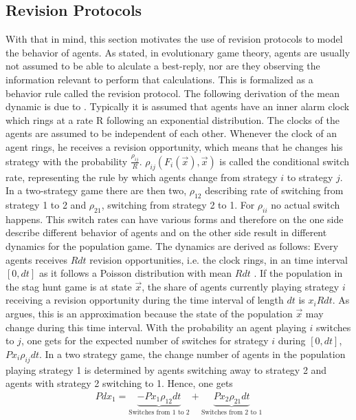 \documentclass[11pt]{article}
\begin{document}
\subsection{Revision Protocols}
\label{sec:revisionprotocols}
With that in mind, this section motivates the use of revision protocols to
model the behavior of agents.
As stated, in evolutionary game theory, agents are usually not assumed to be 
able to alculate a best-reply, nor are they observing the information relevant
to perform that calculations. This is formalized as a behavior rule called
the revision protocol. The following derivation of the mean dynamic is due to 
\textcite{sandholm_population_2010}. Typically it is 
assumed that agents have an inner alarm clock which rings at a rate R 
following an exponential distribution. The clocks of the agents are assumed
to be independent of each other. Whenever the clock of an agent rings, he
receives a revision opportunity, which means that he changes his strategy
with the probability $\frac{\rho_{ij}}{R}$. $\rho_{ij}(F_i(\vec{x}),\vec{x})$
is called the conditional switch rate, representing the rule by which agents
change from strategy $i$ to strategy $j$. 
In a two-strategy game there are then two, $\rho_{12}$ describing rate 
of switching from strategy 1 to 2 and $\rho_{21}$, switching from strategy 2
to 1. For $\rho_{ii}$ no actual switch happens. 
This switch rates can have various forms and therefore on the one side 
describe different behavior of agents and on the other side result in 
different dynamics for the population game.
The dynamics are derived as follows:
Every agents receives $R dt$ revision opportunities, i.e. the clock rings, 
in an time interval $[0,dt]$ as it follows a Poisson distribution with
mean $Rdt$ \cite[123]{sandholm_population_2010}. 
If the population in the stag hunt game is at state $\vec{x}$, the share
of agents currently playing strategy $i$ receiving a revision opportunity 
during the time interval of length $dt$ is $x_i R dt$. As 
\textcite{sandholm_population_2010} argues, this is an approximation because
the state of the population $\vec{x}$ may change during this time interval.
With the probability an agent playing $i$ switches to $j$, one gets for the
expected number of switches for strategy $i$ during $[0,dt]$, 
$P x_i \rho_{ij} dt$. 
In a two strategy game, the change number of agents in the population playing 
strategy 1 is determined by agents switching away to strategy 2 and agents 
with strategy 2 switching to 1.
Hence, one gets
\begin{align}
        Pdx_1 =  \underbrace{-Px_1 \rho_{12}dt}_{\text{Switches from 1 to 2}} 
        + \underbrace{Px_2 \rho_{21}dt}_{\text{Switches from 2 to 1}} 
\end{align}
\end{document}
